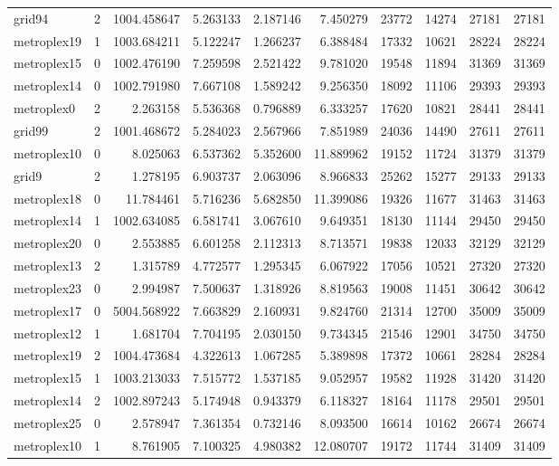 \begin{longtable}{|l|r|r|r|r|r|r|r|r|r|}
grid94 & 2 & 1004.458647 & 5.263133 & 2.187146 & 7.450279 & 23772 & 14274 & 27181 & 27181 \\
metroplex19 & 1 & 1003.684211 & 5.122247 & 1.266237 & 6.388484 & 17332 & 10621 & 28224 & 28224 \\
metroplex15 & 0 & 1002.476190 & 7.259598 & 2.521422 & 9.781020 & 19548 & 11894 & 31369 & 31369 \\
metroplex14 & 0 & 1002.791980 & 7.667108 & 1.589242 & 9.256350 & 18092 & 11106 & 29393 & 29393 \\
metroplex0 & 2 & 2.263158 & 5.536368 & 0.796889 & 6.333257 & 17620 & 10821 & 28441 & 28441 \\
grid99 & 2 & 1001.468672 & 5.284023 & 2.567966 & 7.851989 & 24036 & 14490 & 27611 & 27611 \\
metroplex10 & 0 & 8.025063 & 6.537362 & 5.352600 & 11.889962 & 19152 & 11724 & 31379 & 31379 \\
grid9 & 2 & 1.278195 & 6.903737 & 2.063096 & 8.966833 & 25262 & 15277 & 29133 & 29133 \\
metroplex18 & 0 & 11.784461 & 5.716236 & 5.682850 & 11.399086 & 19326 & 11677 & 31463 & 31463 \\
metroplex14 & 1 & 1002.634085 & 6.581741 & 3.067610 & 9.649351 & 18130 & 11144 & 29450 & 29450 \\
metroplex20 & 0 & 2.553885 & 6.601258 & 2.112313 & 8.713571 & 19838 & 12033 & 32129 & 32129 \\
metroplex13 & 2 & 1.315789 & 4.772577 & 1.295345 & 6.067922 & 17056 & 10521 & 27320 & 27320 \\
metroplex23 & 0 & 2.994987 & 7.500637 & 1.318926 & 8.819563 & 19008 & 11451 & 30642 & 30642 \\
metroplex17 & 0 & 5004.568922 & 7.663829 & 2.160931 & 9.824760 & 21314 & 12700 & 35009 & 35009 \\
metroplex12 & 1 & 1.681704 & 7.704195 & 2.030150 & 9.734345 & 21546 & 12901 & 34750 & 34750 \\
metroplex19 & 2 & 1004.473684 & 4.322613 & 1.067285 & 5.389898 & 17372 & 10661 & 28284 & 28284 \\
metroplex15 & 1 & 1003.213033 & 7.515772 & 1.537185 & 9.052957 & 19582 & 11928 & 31420 & 31420 \\
metroplex14 & 2 & 1002.897243 & 5.174948 & 0.943379 & 6.118327 & 18164 & 11178 & 29501 & 29501 \\
metroplex25 & 0 & 2.578947 & 7.361354 & 0.732146 & 8.093500 & 16614 & 10162 & 26674 & 26674 \\
metroplex10 & 1 & 8.761905 & 7.100325 & 4.980382 & 12.080707 & 19172 & 11744 & 31409 & 31409 \\

\end{longtable}
